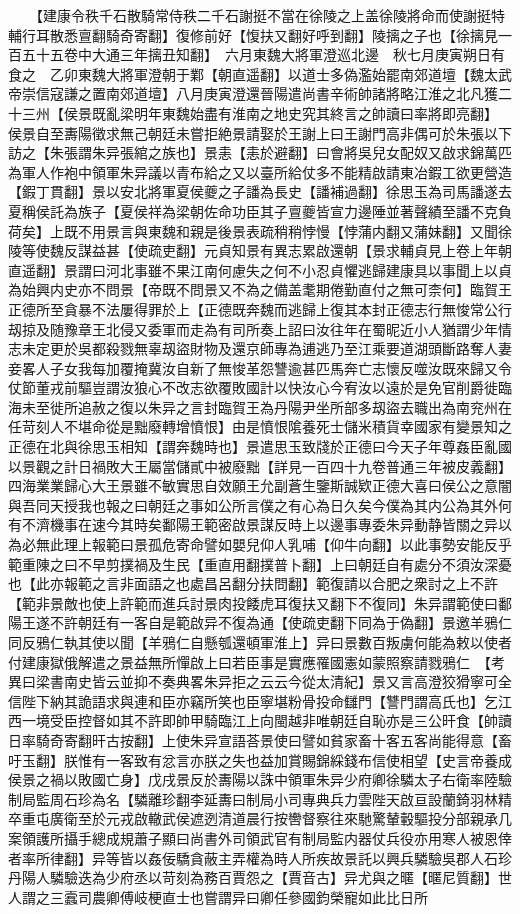 　　【建康令秩千石散騎常侍秩二千石謝挺不當在徐陵之上盖徐陵將命而使謝挺特輔行耳散悉亶翻騎奇寄翻】復修前好【愎扶又翻好呼到翻】陵摛之子也【徐摛見一百五十五卷中大通三年摛丑知翻】　六月東魏大將軍澄巡北邊　秋七月庚寅朔日有食之　乙卯東魏大將軍澄朝于鄴【朝直遥翻】以道士多偽濫始罷南郊道壇【魏太武帝崇信寇謙之置南郊道壇】八月庚寅澄還晉陽遣尚書辛術帥諸將略江淮之北凡獲二十三州【侯景既亂梁明年東魏始盡有淮南之地史究其終言之帥讀曰率將即亮翻】　侯景自至夀陽徵求無己朝廷未嘗拒絶景請娶於王謝上曰王謝門高非偶可於朱張以下訪之【朱張謂朱异張綰之族也】景恚【恚於避翻】曰會將吳兒女配奴又啟求錦萬匹為軍人作袍中領軍朱异議以青布給之又以臺所給仗多不能精啟請東冶鍜工欲更營造【鍜丁貫翻】景以安北將軍夏侯夔之子譒為長史【譒補過翻】徐思玉為司馬譒遂去夏稱侯託為族子【夏侯祥為梁朝佐命功臣其子亶夔皆宣力邊陲並著聲績至譒不克負荷矣】上既不用景言與東魏和親是後景表疏稍稍悖慢【悖蒲内翻又蒲妹翻】又聞徐陵等使魏反謀益甚【使疏吏翻】元貞知景有異志累啟還朝【景求輔貞見上卷上年朝直遥翻】景謂曰河北事雖不果江南何慮失之何不小忍貞懼逃歸建康具以事聞上以貞為始興内史亦不問景【帝既不問景又不為之備盖耄期倦勤直付之無可柰何】臨賀王正德所至貪暴不法屢得罪於上【正德既奔魏而逃歸上復其本封正德志行無悛常公行刼掠及随豫章王北侵又委軍而走為有司所奏上詔曰汝往年在蜀昵近小人猶謂少年情志未定更於吳都殺戮無辜刼盜財物及還京師專為逋逃乃至江乘要道湖頭斷路奪人妻妾畧人子女我每加覆掩冀汝自新了無悛革怨讐逾甚匹馬奔亡志懷反噬汝既來歸又令仗節董戎前驅豈謂汝狼心不改志欲覆敗國計以快汝心今宥汝以遠於是免官削爵徙臨海未至徙所追赦之復以朱异之言封臨賀王為丹陽尹坐所部多刼盜去職出為南兖州在任苛刻人不堪命從是黜廢轉增憤恨】由是憤恨隂養死士儲米積貨幸國家有變景知之正德在北與徐思玉相知【謂奔魏時也】景遣思玉致牋於正德曰今天子年尊姦臣亂國以景觀之計日禍敗大王屬當儲貳中被廢黜【詳見一百四十九卷普通三年被皮義翻】四海業業歸心大王景雖不敏實思自效願王允副蒼生鑒斯誠欵正德大喜曰侯公之意闇與吾同天授我也報之曰朝廷之事如公所言僕之有心為日久矣今僕為其内公為其外何有不濟機事在速今其時矣鄱陽王範密啟景謀反時上以邊事專委朱异動静皆關之异以為必無此理上報範曰景孤危寄命譬如嬰兒仰人乳哺【仰牛向翻】以此事勢安能反乎範重陳之曰不早剪撲禍及生民【重直用翻撲普卜翻】上曰朝廷自有處分不須汝深憂也【此亦報範之言非面語之也處昌呂翻分扶問翻】範復請以合肥之衆討之上不許【範非景敵也使上許範而進兵討景肉投餧虎耳復扶又翻下不復同】朱异謂範使曰鄱陽王遂不許朝廷有一客自是範啟异不復為通【使疏吏翻下同為于偽翻】景邀羊鴉仁同反鴉仁執其使以聞【羊鴉仁自懸瓠還頓軍淮上】异曰景數百叛虜何能為敕以使者付建康獄俄解遣之景益無所憚啟上曰若臣事是實應罹國憲如蒙照察請戮鴉仁　【考異曰梁書南史皆云並抑不奏典畧朱异拒之云云今從太清紀】景又言高澄狡猾寧可全信陛下納其詭語求與連和臣亦竊所笑也臣寧堪粉骨投命讎門【讐門謂高氏也】乞江西一境受臣控督如其不許即帥甲騎臨江上向閩越非唯朝廷自恥亦是三公旰食【帥讀日率騎奇寄翻旰古按翻】上使朱异宣語荅景使曰譬如貧家畜十客五客尚能得意【畜吁玉翻】朕惟有一客致有忿言亦朕之失也益加賞賜錦綵錢布信使相望【史言帝養成侯景之禍以敗國亡身】戊戌景反於夀陽以誅中領軍朱异少府卿徐驎太子右衛率陸驗制局監周石珍為名【驎離珍翻李延夀曰制局小司專典兵力雲陛天啟亘設蘭錡羽林精卒重屯廣衛至於元戎啟轍武侯遮迾清道晨行按轡督察往來馳驚輦轂驅投分部親承几案領護所攝手總成規蕭子顯曰尚書外司領武官有制局監内器仗兵役亦用寒人被恩倖者率所律翻】异等皆以姦佞驕貪蔽主弄權為時人所疾故景託以興兵驎驗吳郡人石珍丹陽人驎驗迭為少府丞以苛刻為務百賈怨之【賈音古】异尤與之暱【暱尼質翻】世人謂之三蠧司農卿傅岐梗直士也嘗謂异曰卿任參國鈞榮寵如此比日所